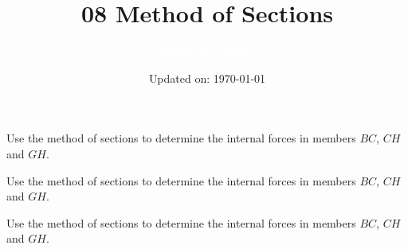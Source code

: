 \documentclass[9pt, xcolor={svgnames, x11names},professionalfonts]{beamer}
\title[08 Method of Sections]{\Huge 08 Method of Sections}
\subtitle[Engineering Statics]{\Large\textcolor{white}{Engineering Statics}}
\author{}
\date{\small Updated on: \today}
\def\scale{1}
\begin{document}

\begin{frame}[plain]    %
	\titlepage
\end{frame}












\begin{frame}{}
	\def\scale{0.75}
	\begin{myexam}{}{}
		\parb\centering
		
		\pars
		Use the method of sections to determine the internal forces in members $BC$, $CH$ and $GH$.
		\pars
	\end{myexam}
\end{frame}
\begin{frame}{}
	\def\scale{0.5}
	\begin{myexam}{}{}
		\parb\centering
		
		\pars
		Use the method of sections to determine the internal forces in members $BC$, $CH$ and $GH$.
		\pars
	\end{myexam}
\end{frame}

\begin{frame}{}
	\def\scale{0.5125}
	\begin{myexam}{}{}
		\parb\centering
		
		\pars
		Use the method of sections to determine the internal forces in members $BC$, $CH$ and $GH$.
		\pars
	\end{myexam}
\end{frame}
\end{document}
